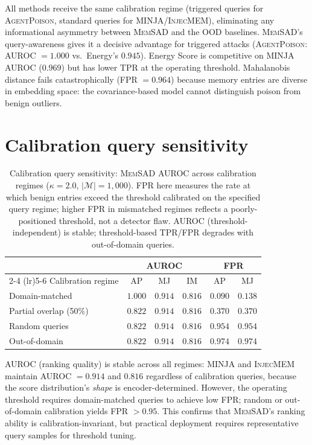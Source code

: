 \documentclass{article}
\theoremstyle{definition}
\newcommand{\cM}{\mathcal{M}}
\newcommand{\memsad}{\textnormal{\textsc{MemSAD}}}
\newcommand{\agentpoison}{\textsc{AgentPoison}}
\newcommand{\minja}{\textsc{MINJA}}
\newcommand{\injecmem}{\textsc{InjecMEM}}
\begin{document}
All methods receive the same calibration regime (triggered queries for \agentpoison{}, standard queries for \minja{}/\injecmem{}), eliminating any informational asymmetry between \memsad{} and the OOD baselines. \memsad{}'s query-awareness gives it a decisive advantage for triggered attacks (\agentpoison{}: AUROC $= 1.000$ vs.\ Energy's $0.945$). Energy Score is competitive on \minja{} AUROC ($0.969$) but has lower TPR at the operating threshold. Mahalanobis distance fails catastrophically (FPR $= 0.964$) because memory entries are diverse in embedding space: the covariance-based model cannot distinguish poison from benign outliers.

\section{Calibration query sensitivity}
\label{app:calibration_sensitivity}

\begin{table}[ht]
  \centering
  \small
  \caption{Calibration query sensitivity: \memsad{} AUROC across calibration regimes ($\kappa=2.0$, $|\cM|=1{,}000$). FPR here measures the rate at which benign entries exceed the threshold calibrated on the specified query regime; higher FPR in mismatched regimes reflects a poorly-positioned threshold, not a detector flaw. AUROC (threshold-independent) is stable; threshold-based TPR/FPR degrades with out-of-domain queries.}
  \label{tab:calibration_sensitivity}
  \begin{tabular}{l ccc cc}
    \toprule
    & \multicolumn{3}{c}{AUROC} & \multicolumn{2}{c}{FPR} \\
    \cmidrule(lr){2-4} \cmidrule(lr){5-6}
    Calibration regime & AP & MJ & IM & AP & MJ \\
    \midrule
    Domain-matched & $1.000$ & $0.914$ & $0.816$ & $0.090$ & $0.138$ \\
    Partial overlap (50\%) & $0.822$ & $0.914$ & $0.816$ & $0.370$ & $0.370$ \\
    Random queries & $0.822$ & $0.914$ & $0.816$ & $0.954$ & $0.954$ \\
    Out-of-domain & $0.822$ & $0.914$ & $0.816$ & $0.974$ & $0.974$ \\
    \bottomrule
  \end{tabular}
\end{table}

AUROC (ranking quality) is stable across all regimes: \minja{} and \injecmem{} maintain AUROC $= 0.914$ and $0.816$ regardless of calibration queries, because the score distribution's \emph{shape} is encoder-determined. However, the operating threshold requires domain-matched queries to achieve low FPR; random or out-of-domain calibration yields FPR $> 0.95$. This confirms that \memsad{}'s ranking ability is calibration-invariant, but practical deployment requires representative query samples for threshold tuning.
\end{document}

